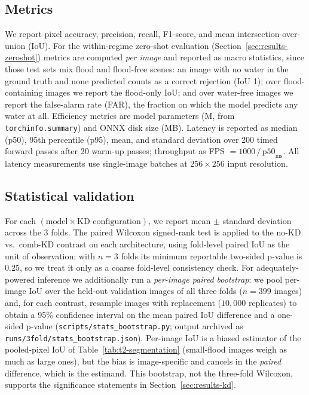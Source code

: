 \subsection{Metrics}
\label{sec:setup-metrics}

We report pixel accuracy, precision, recall, F1-score, and mean intersection-over-union (IoU). For the within-regime zero-shot evaluation (Section~\ref{sec:results-zeroshot}) metrics are computed \emph{per image} and reported as macro statistics, since those test sets mix flood and flood-free scenes: an image with no water in the ground truth and none predicted counts as a correct rejection (IoU 1); over flood-containing images we report the flood-only IoU; and over water-free images we report the false-alarm rate (FAR), the fraction on which the model predicts any water at all. Efficiency metrics are model parameters (M, from \texttt{torchinfo.summary}) and ONNX disk size (MB). Latency is reported as median (p50), 95th percentile (p95), mean, and standard deviation over 200 timed forward passes after 20 warm-up passes; throughput as FPS $= 1000\,/\,\text{p50}_{\text{ms}}$. All latency measurements use single-image batches at $256{\times}256$ input resolution.

\subsection{Statistical validation}
\label{sec:setup-stats}

For each $(\text{model} \times \text{KD configuration})$, we report mean $\pm$ standard deviation across the 3 folds. The paired Wilcoxon signed-rank test is applied to the no-KD vs.~comb-KD contrast on each architecture, using fold-level paired IoU as the unit of observation; with $n=3$ folds its minimum reportable two-sided p-value is 0.25, so we treat it only as a coarse fold-level consistency check. For adequately-powered inference we additionally run a \emph{per-image paired bootstrap}: we pool per-image IoU over the held-out validation images of all three folds ($n=399$ images) and, for each contrast, resample images with replacement ($10{,}000$ replicates) to obtain a 95\% confidence interval on the mean paired IoU difference and a one-sided p-value (\texttt{scripts/stats\_bootstrap.py}; output archived as \texttt{runs/3fold/stats\_bootstrap.json}). Per-image IoU is a biased estimator of the pooled-pixel IoU of Table~\ref{tab:t2-segmentation} (small-flood images weigh as much as large ones), but the bias is image-specific and cancels in the \emph{paired} difference, which is the estimand. This bootstrap, not the three-fold Wilcoxon, supports the significance statements in Section~\ref{sec:results-kd}.

